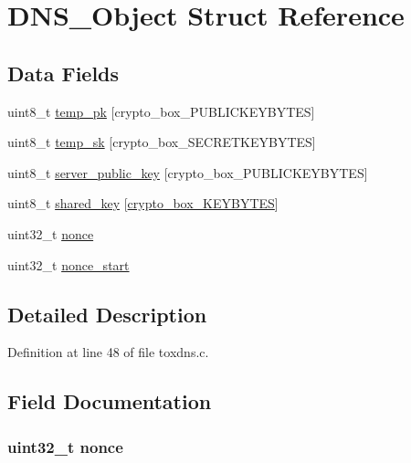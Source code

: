 \hypertarget{struct_d_n_s___object}{\section{D\+N\+S\+\_\+\+Object Struct Reference}
\label{struct_d_n_s___object}
}
\subsection*{Data Fields}
\begin{DoxyCompactItemize}
\item 
uint8\+\_\+t \hyperlink{struct_d_n_s___object_a46affbcc202b25e96fd1f5238e9e97e0}{temp\+\_\+pk} \mbox{[}crypto\+\_\+box\+\_\+\+P\+U\+B\+L\+I\+C\+K\+E\+Y\+B\+Y\+T\+E\+S\mbox{]}
\item 
uint8\+\_\+t \hyperlink{struct_d_n_s___object_a3652189f09ee098ced277788337d95e7}{temp\+\_\+sk} \mbox{[}crypto\+\_\+box\+\_\+\+S\+E\+C\+R\+E\+T\+K\+E\+Y\+B\+Y\+T\+E\+S\mbox{]}
\item 
uint8\+\_\+t \hyperlink{struct_d_n_s___object_acc2e1517636c724d8778c873a4fce5e1}{server\+\_\+public\+\_\+key} \mbox{[}crypto\+\_\+box\+\_\+\+P\+U\+B\+L\+I\+C\+K\+E\+Y\+B\+Y\+T\+E\+S\mbox{]}
\item 
uint8\+\_\+t \hyperlink{struct_d_n_s___object_a0f4a120c7bd84eb7beebe6c163ce5744}{shared\+\_\+key} \mbox{[}\hyperlink{crypto__core_8h_aade7cd33abc5668970c55ed009ab00c8}{crypto\+\_\+box\+\_\+\+K\+E\+Y\+B\+Y\+T\+E\+S}\mbox{]}
\item 
uint32\+\_\+t \hyperlink{struct_d_n_s___object_aa2f9785a9d9116cc4592db06375cb887}{nonce}
\item 
uint32\+\_\+t \hyperlink{struct_d_n_s___object_a9bf0718fc917292d63aa2667d22c0502}{nonce\+\_\+start}
\end{DoxyCompactItemize}


\subsection{Detailed Description}


Definition at line 48 of file toxdns.\+c.



\subsection{Field Documentation}
\hypertarget{struct_d_n_s___object_aa2f9785a9d9116cc4592db06375cb887}{
\subsubsection[{nonce}]{\setlength{\rightskip}{0pt plus 5cm}uint32\+\_\+t nonce}}\label{struct_d_n_s___object_aa2f9785a9d9116cc4592db06375cb887}



